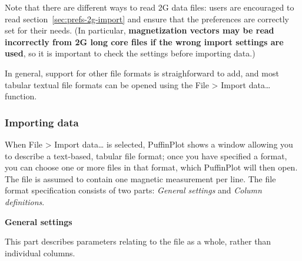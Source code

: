 \documentclass[a4paper,british]{article}
\newcommand{\ppcmd}[1]{\textsf{#1}} %
\newcommand{\caps}[1]{\MakeTextUppercase{#1}} %
\newcommand{\submenu}{ \textgreater{} } %
\newcommand{\mypara}[1]{\noindent\textbf{#1}

\noindent\ignorespaces} %
\begin{document}
\noindent Note that there are different ways to read 2\caps{g} data
files: users are encouraged to read section~\ref{sec:prefs-2g-import}
and ensure that the preferences are correctly set for their needs. (In
particular, \textbf{magnetization vectors may be read incorrectly from
  2G long core files if the wrong import settings are used}, so it is
important to check the settings before importing data.)

In general, support for other file formats is straighforward to add, and most
tabular textual file formats can be opened using the \ppcmd{File\submenu
  Import data\ldots} function.

\subsubsection{\label{sec:import-data}Importing data}

When \ppcmd{File\submenu Import data\ldots} is selected, PuffinPlot
shows a window allowing you to describe a text-based, tabular file
format; once you have specified a format, you can choose one or more
files in that format, which PuffinPlot will then open. The file is
assumed to contain one magnetic measurement per line. The file format
specification consists of two parts: \emph{General settings} and
\emph{Column definitions}.

\mypara{General settings} This part describes parameters relating to the
file as a whole, rather than individual columns.
\end{document}
